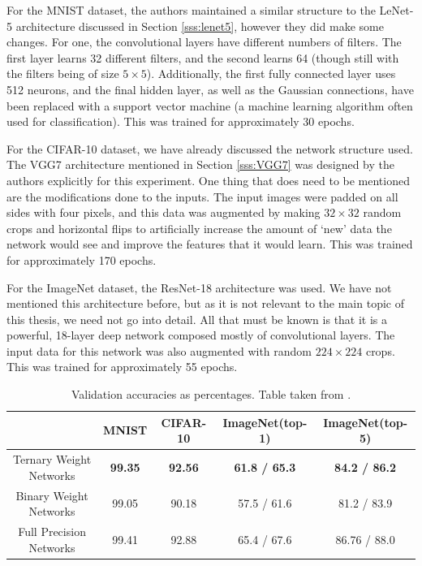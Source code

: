 \documentclass[11pt,a4paper,oldfontcommands]{memoir}
\begin{document}
For the MNIST \cite{mnist} dataset, the authors maintained a similar structure to the LeNet-5 architecture discussed in Section \ref{sss:lenet5}, however they did make some changes. For one, the convolutional layers have different numbers of filters. The first layer learns 32 different filters, and the second learns 64 (though still with the filters being of size $5\times5$). Additionally, the first fully connected layer uses 512 neurons, and the final hidden layer, as well as the Gaussian connections, have been replaced with a support vector machine (a machine learning algorithm often used for classification). This was trained for approximately 30 epochs.

For the CIFAR-10 \cite{cifar} dataset, we have already discussed the network structure used. The VGG7 architecture mentioned in Section \ref{sss:VGG7} was designed by the authors explicitly for this experiment. One thing that does need to be mentioned are the modifications done to the inputs. The input images were padded on all sides with four pixels, and this data was augmented by making $32\times32$ random crops and horizontal flips to artificially increase the amount of `new' data the network would see and improve the features that it would learn. This was trained for approximately 170 epochs.

For the ImageNet \cite{imagenet} dataset, the ResNet-18 \cite{resnet} architecture was used. We have not mentioned this architecture before, but as it is not relevant to the main topic of this thesis, we need not go into detail. All that must be known is that it is a powerful, 18-layer deep network composed mostly of convolutional layers. The input data for this network was also augmented with random $224\times224$ crops. This was trained for approximately 55 epochs.

\begin{table}
\centering
    \begin{tabular}{c c c c c} 
        \hline
         & MNIST & CIFAR-10 & ImageNet(top-1) & ImageNet(top-5) \\ 
        \hline
        Ternary Weight Networks & \textbf{99.35} & \textbf{92.56} & \textbf{61.8 / 65.3} & \textbf{84.2 / 86.2} \\
        Binary Weight Networks & 99.05 & 90.18 & 57.5 / 61.6 & 81.2 / 83.9 \\
        \cline{2-5}
        Full Precision Networks & 99.41 & 92.88 & 65.4 / 67.6 & 86.76 / 88.0 \\
        \hline
    \end{tabular}
\caption{Validation accuracies as percentages. Table taken from \cite{ternary}.}
\label{tab:ternary_results}
\end{table}
\end{document}
